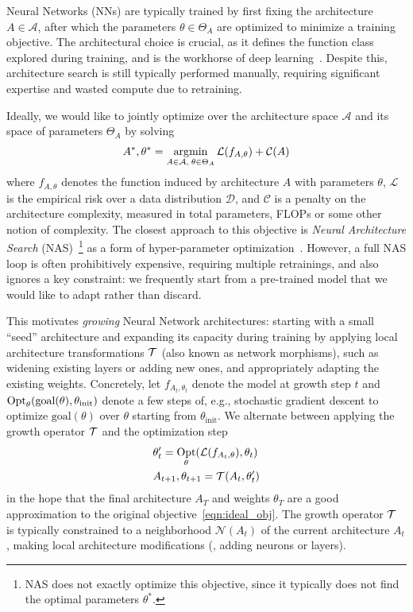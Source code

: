 Neural Networks (NNs) are typically trained by first fixing the architecture $A \in \mathcal{A}$, after which the parameters $\theta \in \Theta_A$ are optimized to minimize a training objective. The architectural choice is crucial, as it defines the function class explored during training,
and is the workhorse of deep learning~\citep{he_deep_2016,vaswani_attention_2017}. Despite this, architecture search is still typically performed manually, requiring significant expertise and wasted compute due to retraining.

Ideally, we would like to jointly optimize over the architecture space $\mathcal{A}$ and its space of parameters $\Theta_A$ by solving
\begin{align}\label{eqn:ideal_obj}
    A^*, \theta^* = \operatorname*{\arg\!\min}_{A\in \mathcal{A},\; \theta \in  \Theta_A}  \mathcal{L}(f_{A,\theta}) + \mathcal{C}(A)
\end{align}
where $f_{A,\theta}$ denotes the function induced by architecture $A$ with parameters $\theta$, $\mathcal{L}$ is the empirical risk over a data distribution $\mathcal{D}$, and $\mathcal{C}$ is a penalty on the architecture complexity, measured in total parameters, FLOPs or some other notion of complexity. The closest approach to this objective is \emph{Neural Architecture Search} (NAS)~\citep{zoph_neural_2017}\footnote{NAS does not exactly optimize this objective, since it typically does not find the optimal parameters $\theta^*$.}
as a form of hyper-parameter optimization~\citep{egele:tel-04636586}. However, a full NAS loop is often prohibitively expensive, requiring multiple retrainings, and also ignores a key constraint: we frequently start from a pre-trained model that we would like to adapt rather than discard.

This motivates \emph{growing} Neural Network architectures: starting with a small ``seed'' architecture and expanding its capacity during training by applying local architecture transformations $\mathcal{T}$ (also known as network morphisms), such as widening existing layers or adding new ones, and appropriately adapting the existing weights. Concretely, let $f_{A_t, \theta_t}$ denote the model at growth step $t$ and $\operatorname*{\text{Opt}}_
\theta(\textrm{goal}(\theta), \theta_{\text{init}})$ denote a few steps of, e.g., stochastic gradient descent to optimize $\text{goal}(\theta)$ over $\theta$ starting from $\theta_{\text{init}}$.
We alternate between applying the growth operator $\mathcal{T}$ and the optimization step
\begin{equation}\label{eqn:grow_decomposition}
\begin{aligned}
    &\theta_t' = \operatorname*{\text{Opt}}_{\theta}(\mathcal{L}(f_{A_t, \theta}), \theta_t )\\
    &A_{t+1}, \theta_{t+1} = \mathcal{T}(A_t, \theta_{t}')
\end{aligned}
\end{equation}
in the hope that the final architecture $A_T$ and weights $\theta_T$ are a good approximation to the original objective~\eqref{eqn:ideal_obj}. The growth operator $\mathcal{T}$ is typically constrained to a neighborhood $\mathcal{N}(A_t)$ of the current architecture $A_t$, making local architecture modifications (\eg{}, adding neurons or layers).


